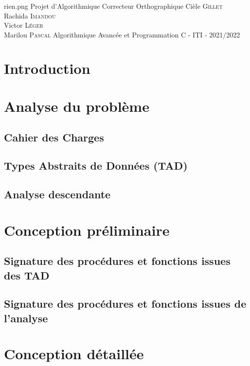 \documentclass[11pt,a4paper]{article}
\begin{document}
\PageDeGarde
{rien.png} %
{Projet d'Algorithmique} %
{Correcteur Orthographique} %
{Cièle \textsc{Gillet}\\
Rachida \textsc{Imandou}\\
Victor \textsc{Léger}\\
Marilou \textsc{Pascal}} %
{Algorithmique Avancée et Programmation C - ITI - 2021/2022} %


\tableofcontents
\newpage
\section{Introduction}
    
\newpage
\section{Analyse du problème}
    \subsection{Cahier des Charges}
    	
    \subsection{Types Abstraits de Données (TAD)}
        
    \subsection{Analyse descendante}
    	
\newpage
\section{Conception préliminaire}
    \subsection{Signature des procédures et fonctions issues des TAD}
        
    \subsection{Signature des procédures et fonctions issues de l'analyse}
        
\newpage
\section{Conception détaillée}
\end{document}
